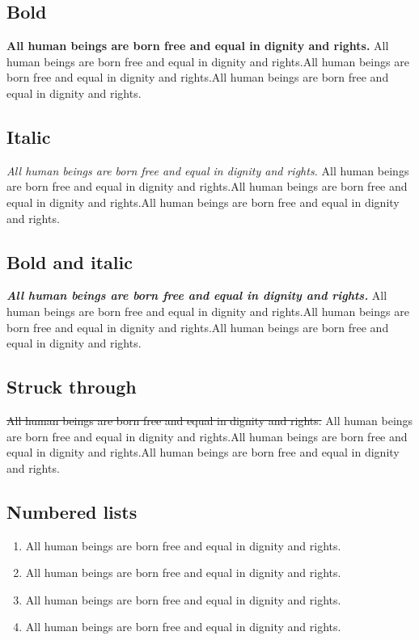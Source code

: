 \documentclass[
  ngerman,
  american,
  ]{scrartcl}
\providecommand{\tightlist}{%
  \setlength{\itemsep}{0pt}\setlength{\parskip}{0pt}}
\begin{document}
\subsection{Bold}\label{bold}

\textbf{All human beings are born free and equal in dignity and rights.}
All human beings are born free and equal in dignity and rights.All human
beings are born free and equal in dignity and rights.All human beings
are born free and equal in dignity and rights.

\subsection{Italic}\label{italic}

\emph{All human beings are born free and equal in dignity and rights.}
All human beings are born free and equal in dignity and rights.All human
beings are born free and equal in dignity and rights.All human beings
are born free and equal in dignity and rights.

\subsection{Bold and italic}\label{bold-and-italic}

\textbf{\emph{All human beings are born free and equal in dignity and
rights.}} All human beings are born free and equal in dignity and
rights.All human beings are born free and equal in dignity and
rights.All human beings are born free and equal in dignity and rights.

\subsection{Struck through}\label{struck-through}

\st{All human beings are born free and equal in dignity and rights.} All
human beings are born free and equal in dignity and rights.All human
beings are born free and equal in dignity and rights.All human beings
are born free and equal in dignity and rights.

\subsection{Numbered lists}\label{numbered-lists}

\begin{enumerate}
\def\labelenumi{\arabic{enumi}.}
\tightlist
\item
  All human beings are born free and equal in dignity and rights.
\item
  All human beings are born free and equal in dignity and rights.
\item
  All human beings are born free and equal in dignity and rights.
\item
  All human beings are born free and equal in dignity and rights.
\end{enumerate}
\end{document}
